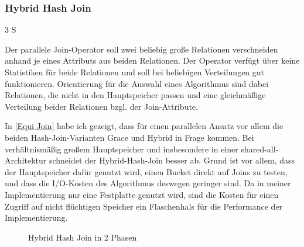 \documentclass[a4paper,12pt,twoside]{article}
\begin{document}
{\subsubsection{Hybrid Hash Join} 3 S
\label{entw:hash}

Der parallele Join-Operator soll zwei beliebig große Relationen verschneiden anhand je eines Attributs aus beiden Relationen. Der Operator verfügt über keine Statistiken für beide Relationen und soll bei beliebigen Verteilungen gut funktionieren. Orientierung für die Auswahl eines Algorithmus sind dabei Relationen, die nicht in den Hauptspeicher passen und eine gleichmäßige Verteilung beider Relationen bzgl. der Join-Attribute.

In \autoref{Equi Join} habe ich gezeigt, dass für einen parallelen Ansatz vor allem die beiden Hash-Join-Varianten Grace und Hybrid in Frage kommen. Bei verhältnismäßig großem Hauptspeicher und insbesondere in einer shared-all-Architektur schneidet der Hybrid-Hash-Join besser ab. Grund ist vor allem, dass der Hauptspeicher dafür genutzt wird, einen Bucket direkt auf Joins zu testen, und dass die I/O-Kosten des Algorithmus deswegen geringer sind. Da in meiner Implementierung nur eine Festplatte genutzt wird, sind die Kosten für einen Zugriff auf nicht flüchtigen Speicher ein Flaschenhals für die Performance der Implementierung.

\begin{figure}
	\centering
	\qquad
	\footnotemark	
	\caption{Hybrid Hash Join in 2 Phasen}
	\label{img:hybrid}
\end{figure}


}
\end{document}
